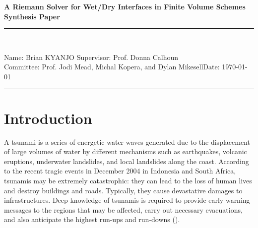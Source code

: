 \documentclass[10pt,a4paper]{article}
\newcommand{\student}{Brian KYANJO }
\newcommand{\course}{Prof. Jodi Mead, Michal Kopera, and Dylan Mikesell}
\newcommand{\assignment}{ Prof. Donna Calhoun}
\begin{document}
	
	\thispagestyle{empty}
	\begin{center}
		\textbf{A Riemann Solver for Wet/Dry Interfaces in Finite Volume Schemes\\[0.5cm]
			Synthesis Paper}
		\vspace{.2cm}
	\end{center}
	
	
	\begin{center}
		\rule{17cm}{0.2cm}\\[0.3cm]
	\end{center}	
	
	\noindent	Name: \student \hfill Supervisor: \assignment\\[0.1cm]
	Committee: \course \hfill Date: \today\\
	\rule{17cm}{0.05cm}
	\vspace{.2cm}
	
	\section{Introduction}
	
				A tsunami is a series of energetic water waves generated due to the displacement of large volumes of water by different mechanisms such as earthquakes, volcanic eruptions, underwater landslides, and local landslides along the coast. According to the recent tragic events in December 2004 in Indonesia and  South Africa, tsunamis may be extremely catastrophic: they can lead to the loss of human lives and destroy buildings and roads. Typically, they cause devastative damages to infrastructures. Deep knowledge of tsunamis is required to provide early warning messages to the regions that may be affected, carry out necessary evacuations, and also anticipate the highest run-ups and run-downs    (\cite{sanchez2016uncertainty,dutykh2007water,dias2007dynamics}).
				
\end{document}
